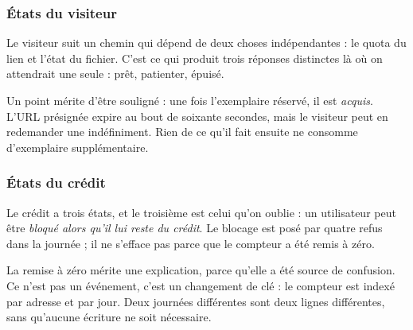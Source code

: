 
\subsubsection{États du visiteur}

Le visiteur suit un chemin qui dépend de deux choses indépendantes : le quota du
lien et l'état du fichier. C'est ce qui produit trois réponses distinctes là où
on attendrait une seule : prêt, patienter, épuisé.


Un point mérite d'être souligné : une fois l'exemplaire réservé, il est
\emph{acquis}. L'URL présignée expire au bout de soixante secondes, mais le
visiteur peut en redemander une indéfiniment. Rien de ce qu'il fait ensuite ne
consomme d'exemplaire supplémentaire.

\subsubsection{États du crédit}

Le crédit a trois états, et le troisième est celui qu'on oublie : un utilisateur
peut être \emph{bloqué alors qu'il lui reste du crédit}. Le blocage est posé par
quatre refus dans la journée ; il ne s'efface pas parce que le compteur a été
remis à zéro.


La remise à zéro mérite une explication, parce qu'elle a été source de confusion.
Ce n'est pas un événement, c'est un changement de clé : le compteur est indexé
par adresse et par jour. Deux journées différentes sont deux lignes différentes,
sans qu'aucune écriture ne soit nécessaire.


